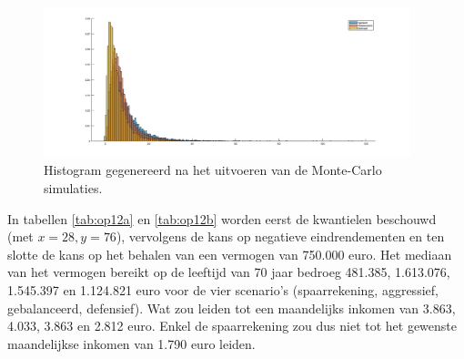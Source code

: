 \begin{figure}
\centering
\includegraphics[width=0.95\textwidth]{res/op11.png}
\caption{Histogram gegenereerd na het uitvoeren van de Monte-Carlo simulaties.}
\label{fig:op11}
\end{figure}
\thispagestyle{empty}
\restoregeometry



In tabellen \ref{tab:op12a} en \ref{tab:op12b} worden eerst de kwantielen beschouwd (met $x=28, y=76$), vervolgens de kans op negatieve eindrendementen en ten slotte de kans op het behalen van een vermogen van 750.000 euro. Het mediaan van het vermogen bereikt op de leeftijd van 70 jaar bedroeg 481.385, 1.613.076, 1.545.397 en 1.124.821 euro voor de vier scenario's (spaarrekening, aggressief, gebalanceerd, defensief). Wat zou leiden tot een maandelijks inkomen van 3.863, 4.033, 3.863 en 2.812 euro. Enkel de spaarrekening zou dus niet tot het gewenste maandelijkse inkomen van 1.790 euro leiden.

